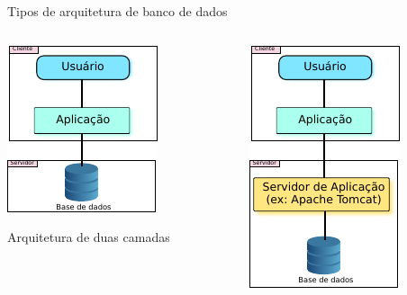 \documentclass[xcolor=x11names,compress]{beamer}
\begin{document}
\begin{frame}{Tipos de arquitetura de banco de dados}

\vspace*{-6mm}
\begin{center}
\begin{columns}[T]
\begin{column}{.5\textwidth}
\centering \includegraphics[keepaspectratio,width=.6\textwidth]{two_tier_db_architecture}

\centering Arquitetura de duas camadas

\end{column}

\begin{column}{.5\textwidth}

\centering \includegraphics[keepaspectratio,width=.6\textwidth]{three_tier_db_architecture}


\end{column}
\end{columns}
\end{center}
\end{frame}
\end{document}
